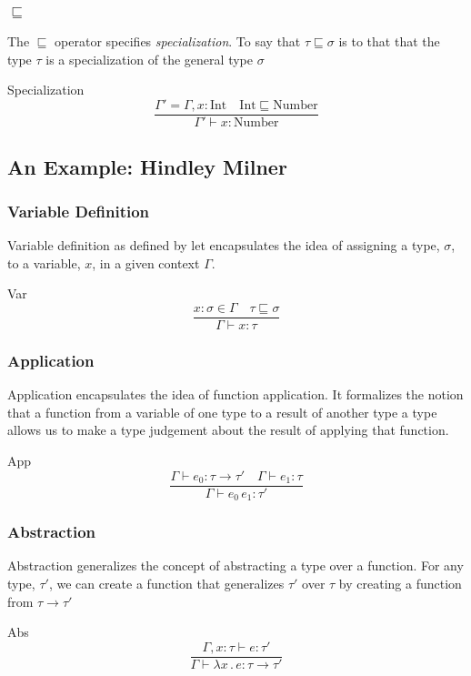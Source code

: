 \documentclass{beamer}
\begin{document}
\begin{frame}
  \frametitle{$\sqsubseteq$}
  The $\sqsubseteq$ operator specifies \emph{specialization}.  To say
  that $\tau \sqsubseteq \sigma$ is to that that the type $\tau$ is a
  specialization of the general type $\sigma$
  \begin{exampleblock}{Specialization}
    \[
      \frac{\Gamma' = \Gamma, x : \text{Int} \quad \text{Int} \sqsubseteq \text{Number}}
      {\Gamma' \vdash x : \text{Number} }
    \]
  \end{exampleblock}
\end{frame}

\subsection{An Example: Hindley Milner}

\begin{frame}
  \frametitle{Variable Definition}
  Variable definition as defined by let encapsulates the idea of
  assigning a type, $\sigma$, to a variable, $x$, in a given context
  $\Gamma$.

  \begin{exampleblock}{Var}
    \[
      \frac{x:\sigma \in \Gamma \quad \tau \sqsubseteq \sigma}{\Gamma \vdash x : \tau}
    \]
  \end{exampleblock}
\end{frame}

\begin{frame}
  \frametitle{Application}
  Application encapsulates the idea of function application. It
  formalizes the notion that a function from a variable of one type to
  a result of another type a type allows us to make a type judgement
  about the result of applying that function.
  \begin{exampleblock}{App}
    \[
      \frac{\Gamma \vdash e_0 : \tau \rightarrow \tau' \quad \Gamma \vdash e_1 : \tau}
      {\Gamma \vdash e_0\, e_1 : \tau'}
    \]
  \end{exampleblock}
\end{frame}

\begin{frame}
  \frametitle{Abstraction}
  Abstraction generalizes the concept of abstracting a type over a
  function.  For any type, $\tau'$, we can create a function that
  generalizes $\tau'$ over $\tau$ by creating a function from
  $\tau \rightarrow \tau'$

  \begin{exampleblock}{Abs}
    \[
      \frac{\Gamma, x : \tau \vdash e : \tau'}
      {\Gamma \vdash \lambda x\, .\, e : \tau \rightarrow \tau'}
    \]
  \end{exampleblock}
\end{frame}
\end{document}
